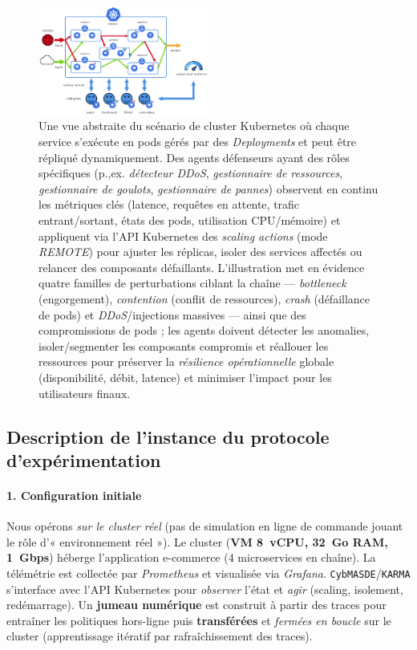 \begin{figure}[h!]
  \centering
  \hspace{-0.4cm}
  \includegraphics[trim=0cm 0cm 0cm 0cm, clip, width=0.5\textwidth]{figures/scenario_introduction.pdf}
  \caption{Une vue abstraite du scénario de cluster Kubernetes où chaque service s’exécute en pods gérés par des \textit{Deployments} et peut être répliqué dynamiquement. Des agents défenseurs ayant des rôles spécifiques (p.,ex. \textit{détecteur DDoS}, \textit{gestionnaire de ressources}, \textit{gestionnaire de goulots}, \textit{gestionnaire de pannes}) observent en continu les métriques clés (latence, requêtes en attente, trafic entrant/sortant, états des pods, utilisation CPU/mémoire) et appliquent via l’API Kubernetes des \textit{scaling actions} (mode \textit{REMOTE}) pour ajuster les réplicas, isoler des services affectés ou relancer des composants défaillants. L’illustration met en évidence quatre familles de perturbations ciblant la chaîne — \textit{bottleneck} (engorgement), \textit{contention} (conflit de ressources), \textit{crash} (défaillance de pods) et \textit{DDoS}/injections massives — ainsi que des compromissions de pods ; les agents doivent détecter les anomalies, isoler/segmenter les composants compromis et réallouer les ressources pour préserver la \textit{résilience opérationnelle} globale (disponibilité, débit, latence) et minimiser l’impact pour les utilisateurs finaux.}
  \label{fig:k8s_cluster_graph_intro}
\end{figure}


\subsection{Description de l'instance du protocole d'expérimentation}

\paragraph{1. Configuration initiale}

Nous opérons \emph{sur le cluster réel} (pas de simulation en ligne de commande jouant le rôle d’« environnement réel »). Le cluster (\textbf{VM 8~vCPU, 32~Go RAM, 1~Gbps}) héberge l’application e-commerce (4 microservices en chaîne). La télémétrie est collectée par \textit{Prometheus} et visualisée via \textit{Grafana}. \texttt{CybMASDE}/\texttt{KARMA} s’interface avec l’API Kubernetes pour \textit{observer} l’état et \textit{agir} (scaling, isolement, redémarrage). Un \textbf{jumeau numérique} est construit à partir des traces pour entraîner les politiques hors-ligne puis \textbf{transférées} et \textit{fermées en boucle} sur le cluster (apprentissage itératif par rafraîchissement des traces).

